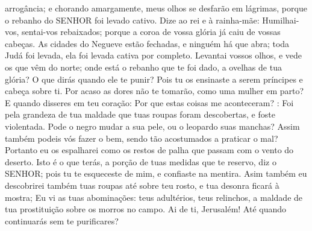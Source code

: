 {{} arrogância; e chorando amargamente, meus olhos se desfarão em lágrimas, porque o rebanho do SENHOR foi levado cativo.
Dize ao rei e à rainha-mãe: Humilhai-vos, sentai-vos rebaixados; porque a coroa de vossa glória já caiu de vossas cabeças.
As cidades do Negueve
 estão fechadas, e ninguém há que
{} abra; toda Judá foi levada, ela foi levada cativa por completo.
Levantai vossos olhos, e vede os que vêm do norte; onde está o rebanho que te foi dado, a ovelhas de tua glória?
O que dirás quando ele te punir? Pois tu os ensinaste a serem príncipes e cabeça sobre ti. Por acaso as dores não te tomarão, como uma mulher em parto?
E quando disseres em teu coração: Por que estas coisas me aconteceram?
{} : Foi pela grandeza de tua maldade que tuas roupas foram descobertas, e foste violentada.
Pode o negro
 mudar a sua pele, ou o leopardo suas manchas? Assim também podeis vós fazer o bem, sendo tão acostumados a praticar o mal?
Portanto eu os espalharei como os restos de palha que passam com o vento do deserto.
Isto é o que terás, a porção de tuas medidas que te reservo,
 diz o SENHOR; pois tu te esqueceste de mim, e confiaste na mentira.
Asim também eu descobrirei também tuas roupas até sobre teu rosto, e tua desonra ficará à mostra;
Eu vi as tuas abominações: teus adultérios, teus relinchos, a maldade de tua prostituição sobre os morros no campo. Ai de ti, Jerusalém! Até quando continuarás sem te purificares?

\par }

